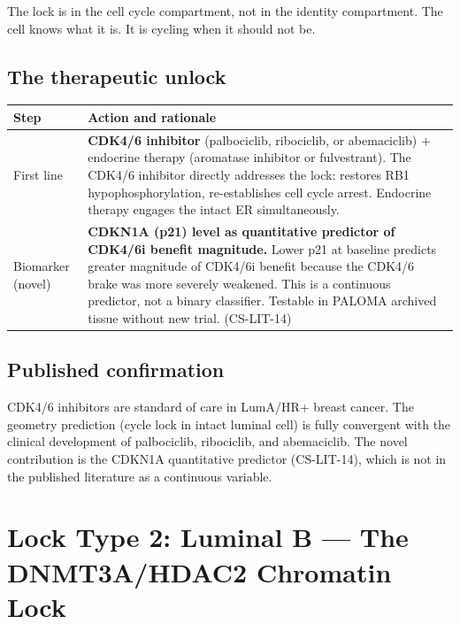 \documentclass[12pt, a4paper]{article}
\begin{document}
The lock is in the cell cycle compartment, not in the
identity compartment. The cell knows what it is.
It is cycling when it should not be.

\subsection{The therapeutic unlock}

\begin{center}
\begin{tabular}{p{3.5cm}p{9cm}}
\toprule
\textbf{Step} & \textbf{Action and rationale} \\
\midrule
First line
& \textbf{CDK4/6 inhibitor} (palbociclib, ribociclib,
  or abemaciclib) $+$ endocrine therapy (aromatase
  inhibitor or fulvestrant). The CDK4/6 inhibitor
  directly addresses the lock: restores RB1
  hypophosphorylation, re-establishes cell cycle arrest.
  Endocrine therapy engages the intact ER simultaneously. \\[0.3em]
Biomarker (novel)
& \textbf{CDKN1A (p21) level as quantitative
  predictor of CDK4/6i benefit magnitude.} Lower
  p21 at baseline predicts greater magnitude of
  CDK4/6i benefit because the CDK4/6 brake was more
  severely weakened. This is a continuous predictor,
  not a binary classifier. Testable in PALOMA archived
  tissue without new trial. (CS-LIT-14) \\
\bottomrule
\end{tabular}
\end{center}

\subsection{Published confirmation}

CDK4/6 inhibitors are standard of care in LumA/HR+
breast cancer. The geometry prediction (cycle lock in
intact luminal cell) is fully convergent with the
clinical development of palbociclib, ribociclib, and
abemaciclib. The novel contribution is the CDKN1A
quantitative predictor (CS-LIT-14), which is not in
the published literature as a continuous variable.

\section{Lock Type 2: Luminal B --- The DNMT3A/HDAC2
Chromatin Lock}
\end{document}

